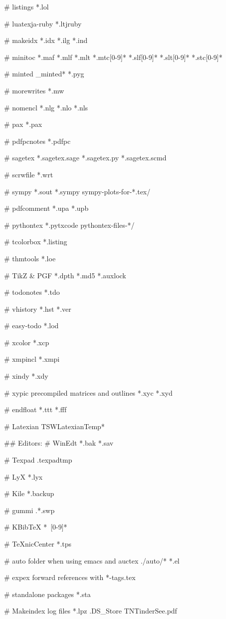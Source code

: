 # listings
*.lol

# luatexja-ruby
*.ltjruby

# makeidx
*.idx
*.ilg
*.ind

# minitoc
*.maf
*.mlf
*.mlt
*.mtc[0-9]*
*.slf[0-9]*
*.slt[0-9]*
*.stc[0-9]*

# minted
_minted*
*.pyg

# morewrites
*.mw

# nomencl
*.nlg
*.nlo
*.nls

# pax
*.pax

# pdfpcnotes
*.pdfpc

# sagetex
*.sagetex.sage
*.sagetex.py
*.sagetex.scmd

# scrwfile
*.wrt

# sympy
*.sout
*.sympy
sympy-plots-for-*.tex/

# pdfcomment
*.upa
*.upb

# pythontex
*.pytxcode
pythontex-files-*/

# tcolorbox
*.listing

# thmtools
*.loe

# TikZ & PGF
*.dpth
*.md5
*.auxlock

# todonotes
*.tdo

# vhistory
*.hst
*.ver

# easy-todo
*.lod

# xcolor
*.xcp

# xmpincl
*.xmpi

# xindy
*.xdy

# xypic precompiled matrices and outlines
*.xyc
*.xyd

# endfloat
*.ttt
*.fff

# Latexian
TSWLatexianTemp*

## Editors:
# WinEdt
*.bak
*.sav

# Texpad
.texpadtmp

# LyX
*.lyx~

# Kile
*.backup

# gummi
.*.swp

# KBibTeX
*~[0-9]*

# TeXnicCenter
*.tps

# auto folder when using emacs and auctex
./auto/*
*.el

# expex forward references with \gathertags
*-tags.tex

# standalone packages
*.sta

# Makeindex log files
*.lpz
.DS_Store
TNTinderSee.pdf